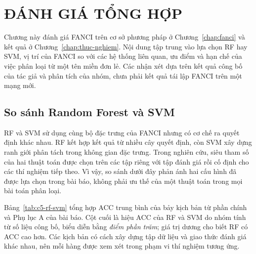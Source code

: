 \section{ĐÁNH GIÁ TỔNG HỢP}\label{chap:danh-gia}

Chương này đánh giá FANCI trên cơ sở phương pháp ở Chương~\ref{chap:fanci} và kết quả ở Chương~\ref{chap:thuc-nghiem}. Nội dung tập trung vào lựa chọn RF hay SVM, vị trí của FANCI so với các hệ thống liên quan, ưu điểm và hạn chế của việc phân loại từ một tên miền đơn lẻ. Các nhận xét dựa trên kết quả công bố của tác giả \cite{schuppen2018fanci} và phân tích của nhóm, chưa phải kết quả tái lập FANCI trên một mạng mới.

\subsection{So sánh Random Forest và SVM}\label{sec:rf-vs-svm}

RF và SVM sử dụng cùng bộ đặc trưng của FANCI nhưng có cơ chế ra quyết định khác nhau. RF kết hợp kết quả từ nhiều cây quyết định, còn SVM xây dựng ranh giới phân tách trong không gian đặc trưng. Trong nghiên cứu, siêu tham số của hai thuật toán được chọn trên các tập riêng với tập đánh giá rồi cố định cho các thí nghiệm tiếp theo. Vì vậy, so sánh dưới đây phản ánh hai cấu hình đã được lựa chọn trong bài báo, không phải ưu thế của một thuật toán trong mọi bài toán phân loại.

Bảng~\ref{tab:c5-rf-svm} tổng hợp ACC trung bình của bảy kịch bản từ phần chính và Phụ lục A của bài báo. Cột cuối là hiệu ACC của RF và SVM do nhóm tính từ số liệu công bố, biểu diễn bằng \emph{điểm phần trăm}; giá trị dương cho biết RF có ACC cao hơn. Các kịch bản có cách xây dựng tập dữ liệu và giao thức đánh giá khác nhau, nên mỗi hàng được xem xét trong phạm vi thí nghiệm tương ứng.


